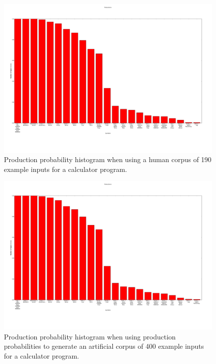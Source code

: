 \begin{figure}
    \begin{center}

\includegraphics[scale=0.23]{figs/human/production_probability_histogram.png}
    \end{center}
        \caption{Production probability histogram when using a human corpus of
190 example inputs for a calculator program.}
    \label{times}
\end{figure}

\begin{figure}
    \begin{center}

\includegraphics[scale=0.23]{figs/gen/pp/production_probability_histogram.png}
    \end{center}
        \caption{Production probability histogram when using production
probabilities
to generate an artificial corpus of 400 example inputs for a calculator
program.}
    \label{times}
\end{figure}

